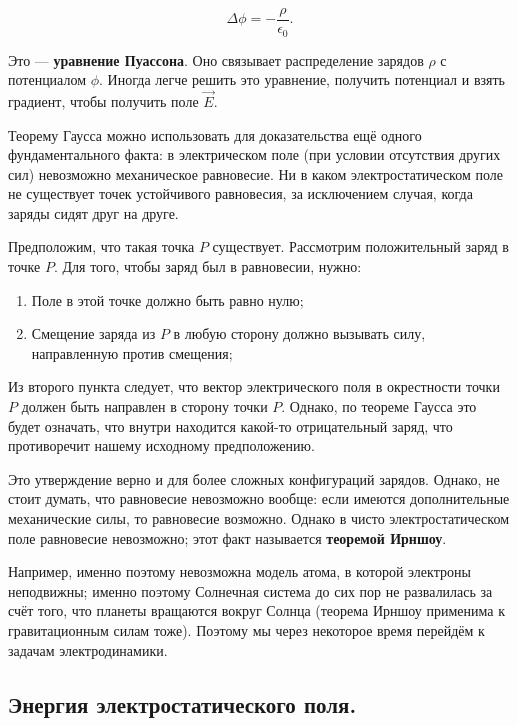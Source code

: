 \documentclass[11pt,a4paper]{article}
\numberwithin{equation}{section}
\newcommand{\eps}{\epsilon}
\begin{document}
\begin{equation}
  \label{eq:poisson_3}
  \Delta \phi = -\frac{\rho}{\eps_0}.
\end{equation}

Это --- \textbf{уравнение Пуассона}. Оно связывает распределение
зарядов $\rho$ с потенциалом $\phi$. Иногда легче решить это
уравнение, получить потенциал и взять градиент, чтобы получить поле
$\vec{E}$. 

Теорему Гаусса можно использовать для доказательства ещё одного
фундаментального факта: в электрическом поле (при условии отсутствия
других сил) невозможно механическое равновесие. Ни в каком
электростатическом поле не существует точек устойчивого равновесия, за
исключением случая, когда заряды сидят друг на друге. 

Предположим, что такая точка $P$ существует. Рассмотрим положительный
заряд в точке $P$. Для того, чтобы заряд был в равновесии, нужно:

\begin{enumerate}
\item Поле в этой точке должно быть равно нулю;
\item Смещение заряда из $P$ в любую сторону должно вызывать силу,
  направленную против смещения;
\end{enumerate}

Из второго пункта следует, что вектор электрического поля в 
окрестности точки $P$ должен быть направлен в сторону точки
$P$. Однако, по теореме Гаусса это будет означать, что внутри
находится какой-то отрицательный заряд, что противоречит нашему
исходному предположению. 

Это утверждение верно и для более сложных конфигураций
зарядов. Однако, не стоит думать, что равновесие невозможно вообще:
если имеются дополнительные механические силы, то равновесие
возможно. Однако в чисто электростатическом поле равновесие
невозможно; этот факт называется \textbf{теоремой Ирншоу}. 

Например, именно поэтому невозможна модель атома, в которой электроны
неподвижны; именно поэтому Солнечная система до сих пор не развалилась
за счёт того, что планеты вращаются вокруг Солнца (теорема Ирншоу
применима к гравитационным силам тоже). Поэтому мы через некоторое
время перейдём к задачам электродинамики. 

\subsection{Энергия электростатического поля.}
\label{sec:statics_energy}
\end{document}
